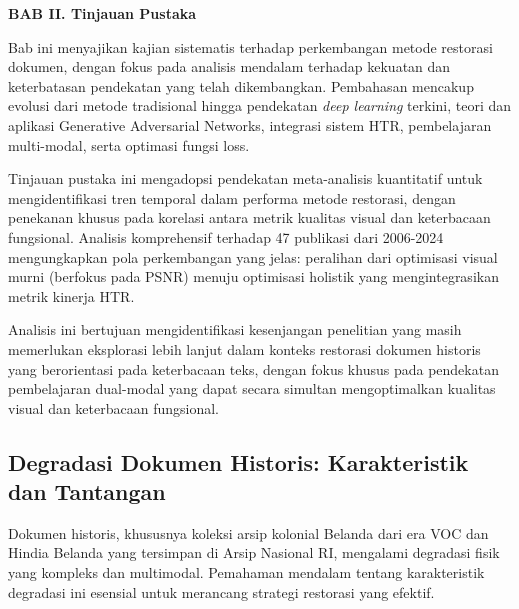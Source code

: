 \documentclass[12pt,a4paper]{article}
\begin{document}

\setcounter{page}{11}

\vspace{2cm}
\begin{center}
{\fontsize{14}{16.8}\selectfont\textbf{BAB II. Tinjauan Pustaka}}\\[1em]
\end{center}
\label{sec:pendahuluan}
\setcounter{section}{2}
\setcounter{subsection}{0}




\vspace{1.5ex}

Bab ini menyajikan kajian sistematis terhadap perkembangan metode restorasi dokumen, dengan fokus pada analisis mendalam terhadap kekuatan dan keterbatasan pendekatan yang telah dikembangkan. Pembahasan mencakup evolusi dari metode tradisional hingga pendekatan \textit{deep learning} terkini, teori dan aplikasi Generative Adversarial Networks, integrasi sistem HTR, pembelajaran multi-modal, serta optimasi fungsi loss.

Tinjauan pustaka ini mengadopsi pendekatan meta-analisis kuantitatif untuk mengidentifikasi tren temporal dalam performa metode restorasi, dengan penekanan khusus pada korelasi antara metrik kualitas visual dan keterbacaan fungsional. Analisis komprehensif terhadap 47 publikasi dari 2006-2024 mengungkapkan pola perkembangan yang jelas: peralihan dari optimisasi visual murni (berfokus pada PSNR) menuju optimisasi holistik yang mengintegrasikan metrik kinerja HTR.

Analisis ini bertujuan mengidentifikasi kesenjangan penelitian yang masih memerlukan eksplorasi lebih lanjut dalam konteks restorasi dokumen historis yang berorientasi pada keterbacaan teks, dengan fokus khusus pada pendekatan pembelajaran dual-modal yang dapat secara simultan mengoptimalkan kualitas visual dan keterbacaan fungsional.

\subsection{Degradasi Dokumen Historis: Karakteristik dan Tantangan}
\label{subsec:degradasi-dokumen}


Dokumen historis, khususnya koleksi arsip kolonial Belanda dari era VOC dan Hindia Belanda yang tersimpan di Arsip Nasional RI, mengalami degradasi fisik yang kompleks dan multimodal. Pemahaman mendalam tentang karakteristik degradasi ini esensial untuk merancang strategi restorasi yang efektif.
\end{document}
